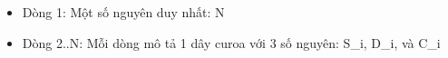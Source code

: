 \begin{itemize}
	\item     Dòng 1: Một số nguyên duy nhất: N   
	\item     Dòng 2..N: Mỗi dòng mô tả 1 dây curoa với 3 số nguyên: S\_i, D\_i, và C\_i   
\end{itemize}